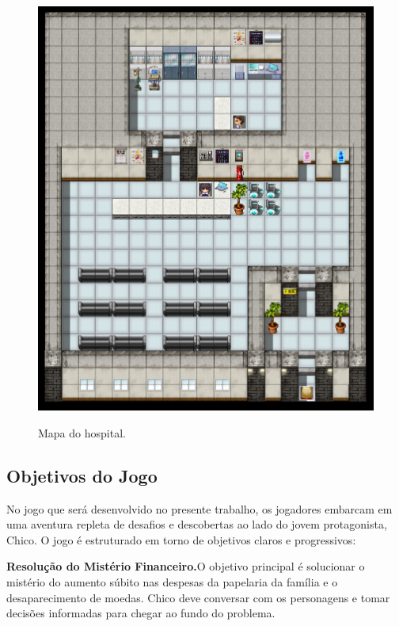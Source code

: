 \begin{figure}[!htbp]
	\centering
	\caption{Mapa do hospital.}
	\includegraphics[scale=0.4]{Textuais/Pictures/Hospital.png}
	\label{fig:hospital}
\end{figure}

\newpage

\subsection{Objetivos do Jogo}

No jogo que será desenvolvido no presente trabalho, os jogadores embarcam em uma aventura repleta de desafios e descobertas ao lado do jovem protagonista, Chico. O jogo é estruturado em torno de objetivos claros e progressivos:

\medskip\noindent \textbf{Resolução do Mistério Financeiro.}\quad O objetivo principal é solucionar o mistério do aumento súbito nas despesas da papelaria da família e o desaparecimento de moedas. Chico deve conversar com os personagens e tomar decisões informadas para chegar ao fundo do problema.

